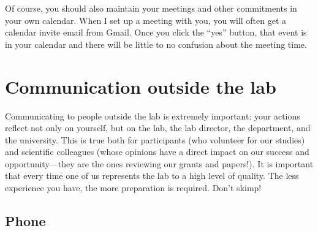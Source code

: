 \documentclass[letterpaper,11pt,oneside]{memoir}
\begin{document}
Of course, you should also maintain your meetings and other commitments in your own calendar. When I set up a meeting with you, you will often get a calendar invite email from Gmail. Once you click the ``yes'' button, that event is in your calendar and there will be little to no confusion about the meeting time. 






\section{Communication outside the lab}

Communicating to people outside the lab is extremely important: your actions reflect not only on yourself, but on the lab, the lab director, the department, and the university. This is true both for participants (who volunteer for our studies) and scientific colleagues (whose opinions have a direct impact on our success and opportunity---they are the ones reviewing our grants and papers!). It is important that every time one of us represents the lab to a high level of quality. The less experience you have, the more preparation is required. Don't skimp!

\subsection{Phone}
\end{document}
